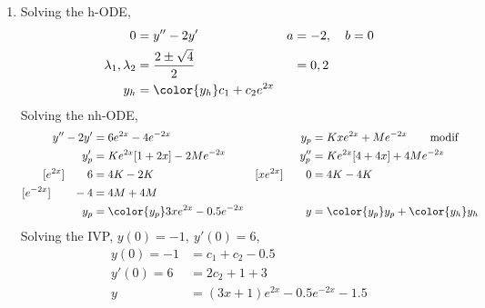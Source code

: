 \begin{enumerate}
    \item Solving the h-ODE,
          \begin{align}
              0                        & = y'' - 2y'                       &
              a                        & = -2, \quad b = 0                   \\
              \lambda_{1}, \lambda_{2} & = \frac{2 \pm \sqrt{4}}{2}        &
                                       & = 0, 2                              \\
              y_{h}                    & = \color{y_h} c_{1} + c_{2}e^{2x}
          \end{align}
          Solving the nh-ODE,
          \begin{align}
              y'' - 2y'           & = 6e^{2x} - 4e^{-2x}                        &
              y_{p}               & = Kxe^{2x} + Me^{-2x} \qquad \text{modif}     \\
              y_{p}'              & = Ke^{2x}[1 + 2x] - 2Me^{-2x}               &
              y_{p}''             & = Ke^{2x}[4 + 4x] + 4Me^{-2x}                 \\
              [e^{2x}] \qquad 6   & = 4K  - 2K                                  &
              [xe^{2x}] \qquad 0  & = 4K - 4K                                     \\
              [e^{-2x}] \qquad -4 & = 4M + 4M                                     \\
              y_{p}               & = \color{y_p} 3xe^{2x} - 0.5e^{-2x}         &
              y                   & = {\color{y_p} y_{p}} + {\color{y_h} y_{h}}
          \end{align}
          Solving the IVP, $ y(0) = -1,\ y'(0) = 6 $,
          \begin{align}
              y(0) = -1 & = c_{1} + c_{2} - 0.5                \\
              y'(0) = 6 & = 2c_{2} + 1 + 3                     \\
              y         & = (3x + 1)e^{2x} - 0.5e^{-2x}  - 1.5
          \end{align}


\end{enumerate}
